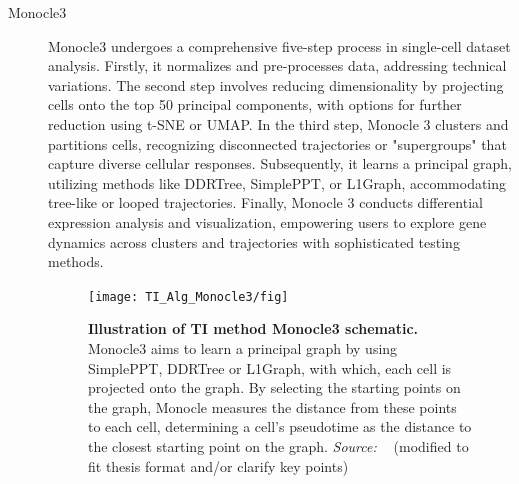 \begin{description}
    \item[Monocle3]
    Monocle3 undergoes a comprehensive five-step process in single-cell dataset analysis\citep{cao2019monocle3}. Firstly, it normalizes and pre-processes data, addressing technical variations. The second step involves reducing dimensionality by projecting cells onto the top 50 principal components, with options for further reduction using t-SNE or UMAP. In the third step, Monocle 3 clusters and partitions cells, recognizing disconnected trajectories or "supergroups" that capture diverse cellular responses. Subsequently, it learns a principal graph, utilizing methods like DDRTree, SimplePPT, or L1Graph, accommodating tree-like or looped trajectories. Finally, Monocle 3 conducts differential expression analysis and visualization, empowering users to explore gene dynamics across clusters and trajectories with sophisticated testing methods.
    \begin{figure}[ht!]
    	\centering
    	\texttt{[image: TI\_Alg\_Monocle3/fig]}
    	\vspace{0.1cm}
    	\caption[Illustration of TI method Monocle3 schematic.]{\textbf{Illustration of TI method Monocle3 schematic.} Monocle3 aims to learn a principal graph by using SimplePPT, DDRTree or L1Graph, with which, each cell is projected onto the graph. By selecting the starting points on the graph, Monocle measures the distance from these points to each cell, determining a cell's pseudotime as the distance to the closest starting point on the graph. \emph{Source: ~\cite{cao2019monocle3}} (modified to fit thesis format and/or clarify key points)
    	}
    	\label{fig:TI_Alg_Monocle3}
    \end{figure}


\end{description}

